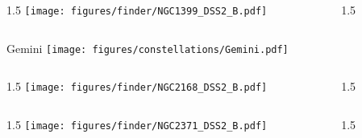 \documentclass[final]{beamer}
\newlength{\colwidth}
\begin{document}

\begin{frame}[t]{}
    \begin{columns}[T]
        \begin{column}{1.5\colwidth}
            \centering
            \texttt{[image: figures/finder/NGC1399\_DSS2\_B.pdf]}
        \end{column}
        \begin{column}{1.5\colwidth}
            \Large
            
        \end{column}
    \end{columns}
    \vspace{\fill}
\end{frame}


\begin{frame}[t]{\LARGE Gemini}
    \centering
    \texttt{[image: figures/constellations/Gemini.pdf]}
\end{frame}


\begin{frame}[t]{}
    \begin{columns}[T]
        \begin{column}{1.5\colwidth}
            \centering
            \texttt{[image: figures/finder/NGC2168\_DSS2\_B.pdf]}
        \end{column}
        \begin{column}{1.5\colwidth}
            \Large
            
        \end{column}
    \end{columns}
    \vspace{\fill}
    \begin{columns}[T]
        \begin{column}{1.5\colwidth}
            \centering
            \texttt{[image: figures/finder/NGC2371\_DSS2\_B.pdf]}
        \end{column}
        \begin{column}{1.5\colwidth}
            \Large
            
        \end{column}
    \end{columns}
\end{frame}
\end{document}
